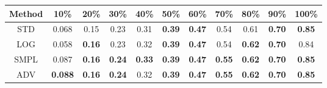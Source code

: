 \documentclass{standalone}
\begin{document}
\begin{tabular}{c|cccccccccc}
      \toprule
      Method & 10\% & 20\% & 30\% & 40\% & 50\% & 60\% & 70\% & 80\% & 90\% & 100\% \\
      \midrule
STD & 0.068 & 0.15 & 0.23 & 0.31 & \textbf{0.39} & \textbf{0.47} & 0.54 & 0.61 & \textbf{0.70} & \textbf{0.85}\\
LOG & 0.058 & \textbf{0.16} & 0.23 & 0.32 & \textbf{0.39} & \textbf{0.47} & 0.54 & \textbf{0.62} & \textbf{0.70} & 0.84\\
SMPL & 0.087 & \textbf{0.16} & \textbf{0.24} & \textbf{0.33} & \textbf{0.39} & \textbf{0.47} & \textbf{0.55} & \textbf{0.62} & \textbf{0.70} & \textbf{0.85}\\
ADV & \textbf{0.088} & \textbf{0.16} & \textbf{0.24} & 0.32 & \textbf{0.39} & \textbf{0.47} & \textbf{0.55} & \textbf{0.62} & \textbf{0.70} & \textbf{0.85}\\
  \bottomrule
\end{tabular}
\end{document}
